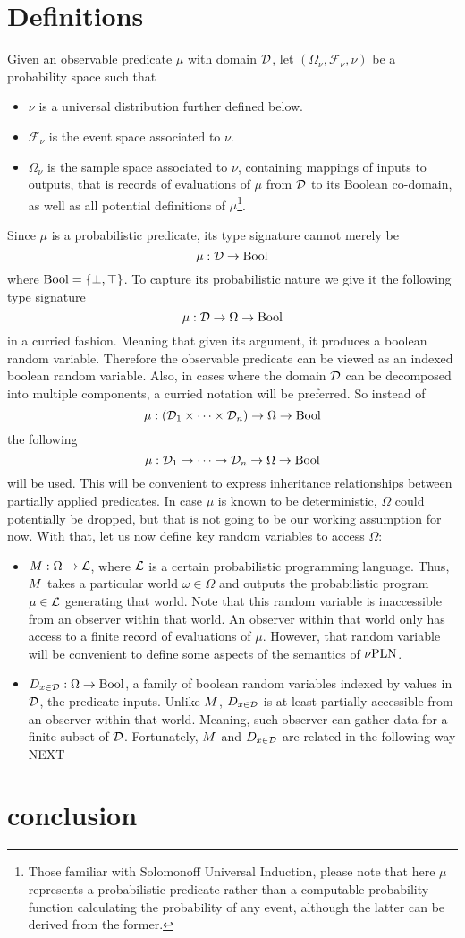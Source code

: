 \documentclass[]{article}
\begin{document}
\section{Definitions}
Given an observable predicate $\mu$ with domain $\mathcal{D}$, let
$(\Omega_\nu, \mathcal{F_\nu}, \nu)$ be a probability space such that
\begin{itemize}
\item $\nu$ is a universal distribution further defined below.
\item $\mathcal{F_\nu}$ is the event space associated to $\nu$.
\item $\Omega_\nu$ is the sample space associated to $\nu$, containing
  mappings of inputs to outputs, that is records of evaluations of
  $\mu$ from $\mathcal{D}$ to its Boolean co-domain, as well as all
  potential definitions of $\mu$\footnote{Those familiar with
  Solomonoff Universal Induction, please note that here $\mu$
  represents a probabilistic predicate rather than a computable
  probability function calculating the probability of any event,
  although the latter can be derived from the former.}.
\end{itemize}
Since $\mu$ is a probabilistic predicate, its type signature cannot
merely be
$$\mu : \mathcal{D} \to \textup{Bool}$$ where $\textup{Bool} = \{\bot, \top\}$.  To capture
its probabilistic nature we give it the following type signature
$$\mu : \mathcal{D} \to \Omega \to \textup{Bool}$$ in a curried fashion.  Meaning
that given its argument, it produces a boolean random variable.
Therefore the observable predicate can be viewed as an indexed boolean
random variable.  Also, in cases where the domain $\mathcal{D}$ can be
decomposed into multiple components, a curried notation will be
preferred.  So instead of
$$\mu : (\mathcal{D}_1 \times \dots \times \mathcal{D}_n) \to \Omega \to \textup{Bool}$$
the following
$$\mu : \mathcal{D}_1 \to \dots \to \mathcal{D}_n \to \Omega \to \textup{Bool}$$ will
be used.  This will be convenient to express inheritance relationships
between partially applied predicates.  In case $\mu$ is known to be
deterministic, $\Omega$ could potentially be dropped, but that is not
going to be our working assumption for now.  With that, let us now
define key random variables to access $\Omega$:
\begin{itemize}
\item $M : \Omega \to \mathcal{L}$, where $\mathcal{L}$ is a certain
  probabilistic programming language.  Thus, $M$ takes a particular
  world $\omega \in \Omega$ and outputs the probabilistic program $\mu
  \in \mathcal{L}$ generating that world.  Note that this random
  variable is inaccessible from an observer within that world.  An
  observer within that world only has access to a finite record of
  evaluations of $\mu$.  However, that random variable will be
  convenient to define some aspects of the semantics of $\nu\textup{PLN}$.
\item $D_{x\in\mathcal{D}} : \Omega \to \textup{Bool}$, a family of boolean random variables
  indexed by values in $\mathcal{D}$, the predicate inputs.  Unlike
  $M$, $D_{x\in\mathcal{D}}$ is at least partially accessible from an observer
  within that world.  Meaning, such observer can gather data for a
  finite subset of $\mathcal{D}$.  Fortunately, $M$ and $D_{x\in\mathcal{D}}$ are
  related in the following way NEXT
\end{itemize}
\section{conclusion}



\end{document}
